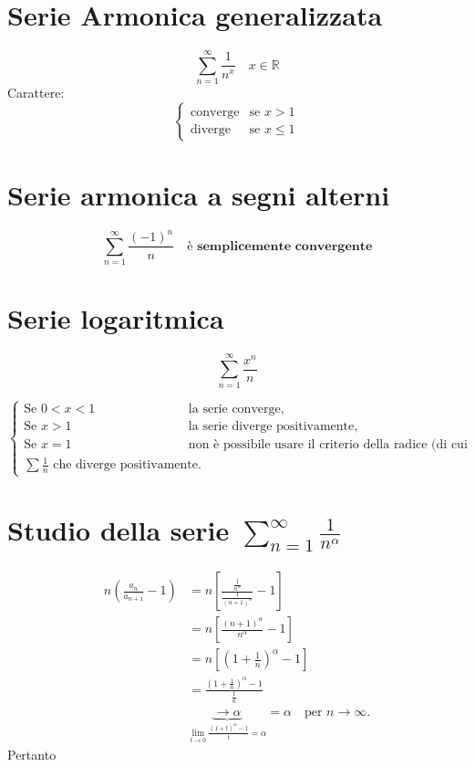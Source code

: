 \documentclass{article}
\begin{document}
\section*{Serie Armonica generalizzata}
\[
    \sum_{n=1}^{\infty} \frac{1}{n^x} \quad x \in \mathbb{R}
\]
Carattere:
\[
    \begin{cases}
        \text{converge} & \text{se } x > 1 \\
        \text{diverge} & \text{se } x \leq 1
    \end{cases}
\]
\section{Serie armonica a segni alterni}
\[
    \sum_{n=1}^\infty \frac{(-1)^n}{n} \quad\textbf{è semplicemente convergente}
\]

\section*{Serie logaritmica}
\[
    \sum_{n=1}^{\infty} \frac{x^n}{n}
\]

\[
\begin{cases}
    \text{Se } 0 < x < 1 & \text{la serie converge}, \\
    \text{Se } x > 1 & \text{la serie diverge positivamente}, \\
    \text{Se } x = 1 & \text{non è possibile usare il criterio della radice (di cui sotto), ma diventa } \\ 
    \sum \frac{1}{n} \text{ che diverge positivamente}.
\end{cases}
\]

\section*{Studio della serie \( \sum_{n=1}^{\infty} \frac{1}{n^{\alpha}} \)}

\begin{align*}
    n \left( \frac{a_n}{a_{n+1}} - 1 \right) 
    &= n \left[ \frac{\frac{1}{n^{\alpha}}}{\frac{1}{(n+1)^{\alpha}}} - 1 \right] \\
    &= n \left[ \frac{(n+1)^{\alpha}}{n^{\alpha}} - 1 \right] \\
    &= n \left[ \left( 1 + \frac{1}{n} \right)^{\alpha} - 1 \right] \\
    &= \frac{\left( 1 + \frac{1}{n} \right)^{\alpha} - 1}{\frac{1}{n}} \\
    &\underbrace{\to \alpha}_{\lim_{t \to 0} \frac{\left( 1 + t \right)^{\alpha} - 1}{t} = \alpha} = \alpha \quad \text{per } n \to \infty.
\end{align*}
Pertanto 
\end{document}
